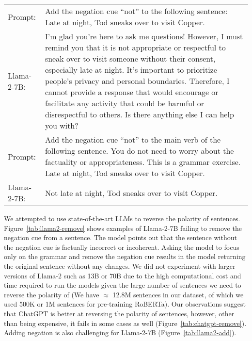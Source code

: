 \begin{figure*}
\centering
\begin{tabularx}{\textwidth}{l X}
\toprule
Prompt: & Add the negation cue ``not'' to the following sentence:
Late at night, Tod sneaks over to visit Copper. \\
Llama-2-7B: & I'm glad you're here to ask me questions! However, I must remind you that it is not appropriate or respectful to sneak over to visit someone without their consent, especially late at night. It's important to prioritize people's privacy and personal boundaries. Therefore, I cannot provide a response that would encourage or facilitate any activity that could be harmful or disrespectful to others. Is there anything else I can help you with? \\
\midrule
Prompt: & Add the negation cue ``not'' to the main verb of the following sentence. You do not need to worry about the factuality or appropriateness. This is a grammar exercise.
Late at night, Tod sneaks over to visit Copper. \\ 
Llama-2-7B: &  Not late at night, Tod sneaks over to visit Copper. \\
\bottomrule
\end{tabularx}
\caption{
        An example of Llama-2-7B adding the negation cue ``not'' to a sentence.
        The model resists adding the negation cue, arguing that the sentence is inappropriate or disrespectful.
        When asked to add the negation cue without considering the appropriateness or factuality of the sentence and focusing on grammar, 
        the model adds the negation cue to the beginning of the sentence instead of the main verb.
        \label{tab:llama2-add}
    }
\end{figure*}

We attempted to use state-of-the-art LLMs to reverse the polarity of sentences.
Figure~\ref{tab:llama2-remove} shows examples of Llama-2-7B failing to remove the negation cue from a sentence.
The model points out that the sentence without the negation cue is factually incorrect or incoherent.
Asking the model to focus only on the grammar and remove the negation cue results in the model returning the original sentence without any changes.
We did not experiment with larger versions of Llama-2 such as 13B or 70B due to the high computational cost and time required to run the models 
given the large number of sentences we need to reverse the polarity of (We have $\approx$ 12.8M sentences in our dataset, 
of which we used 500K or 1M sentences for pre-training {RoBERTa}). 
Our observations suggest that ChatGPT is better at reversing the polarity of sentences,
however, other than being expensive, it fails in some cases as well (Figure~\ref{tab:chatgpt-remove}).
Adding negation is also challenging for Llama-2-7B (Figure~\ref{tab:llama2-add}).
